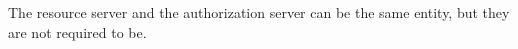 The resource server and the authorization server can be the same entity, but they are not required to be.

%
%


%
%
%
%
%
